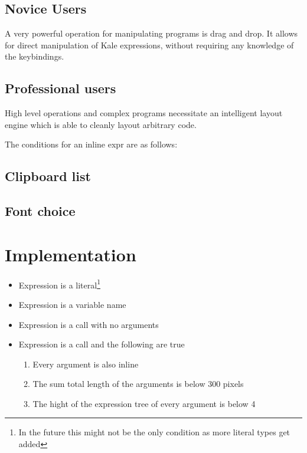 \documentclass[11pt]{report}
\begin{document}
\section{Novice Users}
A very powerful operation for manipulating programs is drag and drop. It allows
for direct manipulation of Kale expressions, without requiring any knowledge of
the keybindings.

\section{Professional users}


High level operations and complex programs necessitate an intelligent layout
engine which is able to cleanly layout arbitrary code.

The conditions for an inline expr are as follows:


\section{Clipboard list}

\section{Font choice}

\chapter{Implementation}

\begin{itemize}
	\item Expression is a literal\footnote{In the future this might not be the
only condition as more literal types get added}
	\item Expression is a variable name
	\item Expression is a call with no arguments
	\item Expression is a call and the following are true
	\begin{enumerate}
		\item Every argument is also inline
		\item The sum total length of the arguments is below 300 pixels
		\item The hight of the expression tree of every argument is below 4
	\end{enumerate}
\end{itemize}
\end{document}

